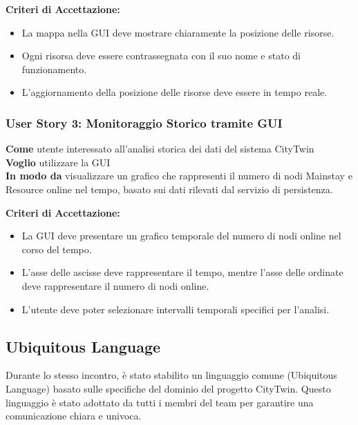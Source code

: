 \textbf{Criteri di Accettazione:}
\begin{itemize}
  \item La mappa nella GUI deve mostrare chiaramente la posizione delle risorse.
  \item Ogni risorsa deve essere contrassegnata con il suo nome e stato di funzionamento.
  \item L'aggiornamento della posizione delle risorse deve essere in tempo reale.
\end{itemize}

\subsubsection{User Story 3: Monitoraggio Storico tramite GUI}

\textbf{Come} utente interessato all'analisi storica dei dati del sistema CityTwin \\
\textbf{Voglio} utilizzare la GUI \\
\textbf{In modo da} visualizzare un grafico che rappresenti il numero di nodi Mainstay e Resource online nel tempo, basato sui dati rilevati dal servizio di persistenza.

\textbf{Criteri di Accettazione:}
\begin{itemize}
  \item La GUI deve presentare un grafico temporale del numero di nodi online nel corso del tempo.
  \item L'asse delle ascisse deve rappresentare il tempo, mentre l'asse delle ordinate deve rappresentare il numero di nodi online.
  \item L'utente deve poter selezionare intervalli temporali specifici per l'analisi.
\end{itemize}

\subsection{Ubiquitous Language}

Durante lo stesso incontro, è stato stabilito un linguaggio comune (Ubiquitous Language) basato sulle specifiche del dominio del progetto CityTwin. Questo linguaggio è stato adottato da tutti i membri del team per garantire una comunicazione chiara e univoca.

